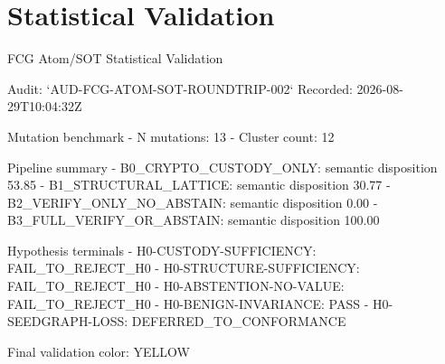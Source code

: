 \section{Statistical Validation}
 FCG Atom/SOT Statistical Validation

Audit: `AUD-FCG-ATOM-SOT-ROUNDTRIP-002`
Recorded: 2026-08-29T10:04:32Z

 Mutation benchmark
- N mutations: 13
- Cluster count: 12

 Pipeline summary
- B0_CRYPTO_CUSTODY_ONLY: semantic disposition 53.85%
- B1_STRUCTURAL_LATTICE: semantic disposition 30.77%
- B2_VERIFY_ONLY_NO_ABSTAIN: semantic disposition 0.00%
- B3_FULL_VERIFY_OR_ABSTAIN: semantic disposition 100.00%

 Hypothesis terminals
- H0-CUSTODY-SUFFICIENCY: FAIL_TO_REJECT_H0
- H0-STRUCTURE-SUFFICIENCY: FAIL_TO_REJECT_H0
- H0-ABSTENTION-NO-VALUE: FAIL_TO_REJECT_H0
- H0-BENIGN-INVARIANCE: PASS
- H0-SEEDGRAPH-LOSS: DEFERRED_TO_CONFORMANCE

 Final validation color: YELLOW
